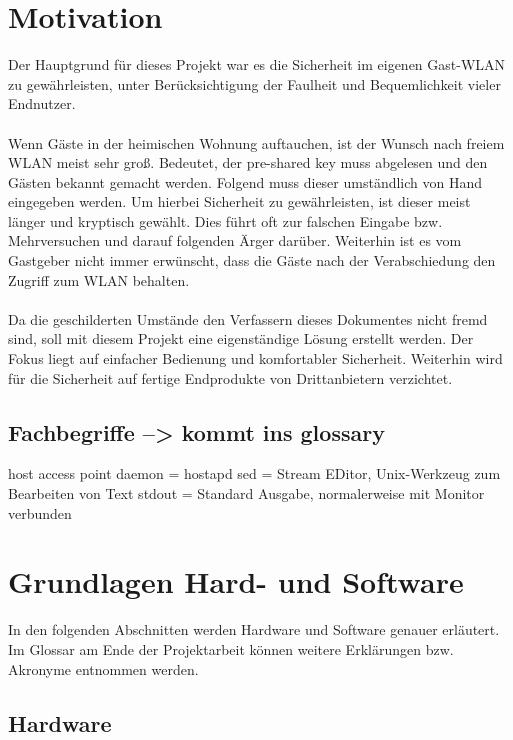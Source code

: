 \documentclass[a4paper,11pt,singlespacing]{article}
\begin{document}
    	\pagestyle{empty}
    	\tableofcontents
    	\cleardoublepage
    	\pagestyle{plain}

    \section{Motivation}
    	Der Hauptgrund für dieses Projekt war es die Sicherheit im eigenen Gast-WLAN zu gewährleisten, unter Berücksichtigung der Faulheit und Bequemlichkeit vieler Endnutzer. \\ \\
    	Wenn Gäste in der heimischen Wohnung auftauchen, ist der Wunsch nach freiem WLAN meist sehr groß. Bedeutet, der pre-shared key muss abgelesen und den Gästen bekannt gemacht werden. Folgend muss dieser umständlich von Hand eingegeben werden. Um hierbei Sicherheit zu gewährleisten, ist dieser meist länger und kryptisch gewählt. Dies führt oft zur falschen Eingabe bzw. Mehrversuchen und darauf folgenden Ärger darüber. Weiterhin ist es vom Gastgeber nicht immer erwünscht, dass die Gäste nach der Verabschiedung den Zugriff zum WLAN behalten. \\ \\
    	Da die geschilderten Umstände den Verfassern dieses Dokumentes nicht fremd sind, soll mit diesem Projekt eine eigenständige Lösung erstellt werden. Der Fokus liegt auf einfacher Bedienung und komfortabler Sicherheit. Weiterhin wird für die Sicherheit auf fertige Endprodukte von Drittanbietern verzichtet. 
    	
    	\subsection{Fachbegriffe --> kommt ins glossary} 
    	host access point daemon = hostapd
    	sed = Stream EDitor, Unix-Werkzeug zum Bearbeiten von Text
    	stdout = Standard Ausgabe, normalerweise mit Monitor verbunden
    	
    	
    \section{Grundlagen Hard- und Software}
      	In den folgenden Abschnitten werden Hardware und Software genauer erläutert. Im Glossar am Ende der Projektarbeit können weitere Erklärungen bzw. Akronyme entnommen werden.
      	\subsection{Hardware}
\end{document}
